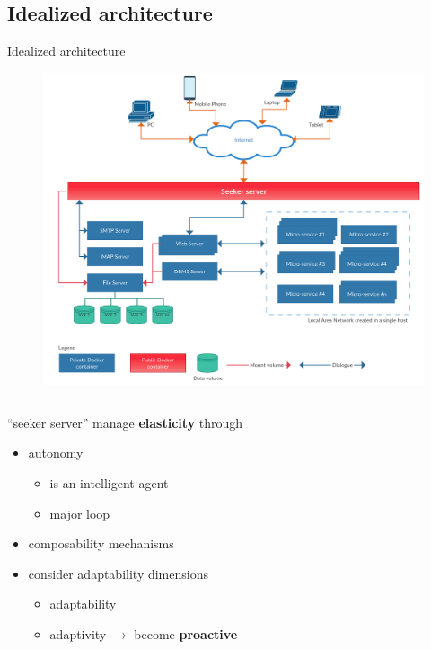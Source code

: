 \subsection{Idealized architecture}
\begin{frame}{Idealized architecture}
	\only<1>
	{
		\begin{figure}
			\centering{}
			\includegraphics[scale=0.11]{images/architecture.png}
		\end{figure}
	}
	{
		\begin{columns}
			\begin{column}{0.7\textwidth}
				``seeker server'' manage \textbf{elasticity} through
				\begin{itemize}
					\item{\footnotesize{autonomy}}
					\begin{itemize}
						\item{\scriptsize{is an intelligent agent}}
						\item{\scriptsize{major loop}}
					\end{itemize}
					\item{\footnotesize{composability mechanisms}}
					\item{\footnotesize{consider adaptability dimensions}}
					\begin{itemize}
						\item{\scriptsize{adaptability}}
						\item{\scriptsize{adaptivity $\rightarrow{}$ become \textbf{proactive}}}
					\end{itemize}

\end{itemize}
\end{column}
\end{columns}}
\end{frame}

